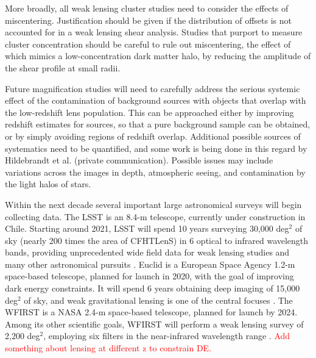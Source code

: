 More broadly, all weak lensing cluster studies need to consider the effects of miscentering. Justification should be given if the distribution of offsets is not accounted for in a weak lensing shear analysis. Studies that purport to measure cluster concentration should be careful to rule out miscentering, the effect of which mimics a low-concentration dark matter halo, by reducing the amplitude of the shear profile at small radii. 

Future magnification studies will need to carefully address the serious systemic effect of the contamination of background sources with objects that overlap with the low-redshift lens population. This can be approached either by improving redshift estimates for sources, so that a pure background sample can be obtained, or by simply avoiding regions of redshift overlap. Additional possible sources of systematics need to be quantified, and some work is being done in this regard by Hildebrandt et al. (private communication). Possible issues may include variations across the images in depth, atmospheric seeing, and contamination by the light halos of stars.

Within the next decade several important large astronomical surveys will begin collecting data. The \acf{LSST} is an 8.4-m telescope, currently under construction in Chile. Starting around 2021, \ac{LSST} will spend 10 years surveying 30,000 deg$^2$ of sky (nearly 200 times the area of \ac{CFHTLenS}) in 6 optical to infrared wavelength bands, providing unprecedented wide field data for weak lensing studies and many other astronomical pursuits \citep{LSST2.0}. \acs{Euclid} is a European Space Agency 1.2-m space-based telescope, planned for launch in 2020, with the goal of improving dark energy constraints. It will spend 6 years obtaining deep imaging of 15,000 deg$^2$ of sky, and weak gravitational lensing is one of the central focuses \citep{Euclid}. The \acf{WFIRST} is a NASA 2.4-m space-based telescope, planned for launch by 2024. Among its other scientific goals, \ac{WFIRST} will perform a weak lensing survey of 2,200 deg$^2$, employing six filters in the near-infrared wavelength range \citep{WFIRST}. \textcolor{red}{Add something about lensing at different z to constrain DE.} 

